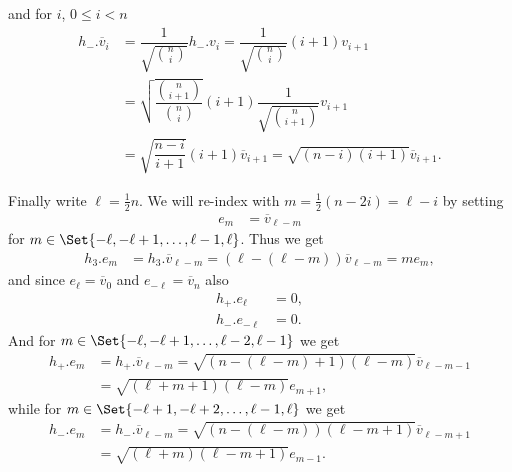 and for $i$, $0\leq i<n$
\begin{align*}
  h_-.\overline v_i &= \dfrac{1}{\sqrt{\binom{n}{i}}}h_-.v_i = \dfrac{1}{\sqrt{\binom{n}{i}}}(i+1)v_{i+1} \\
         &= \sqrt{\dfrac{\binom{n}{i+1}}{\binom{n}{i}}}(i+1)\dfrac{1}{\sqrt{\binom{n}{i+1}}}v_{i+1} \\
  &= \sqrt{\dfrac{n-i}{i+1}}(i+1)\overline v_{i+1} = \sqrt{(n-i)(i+1)}\overline v_{i+1}.
\end{align*}

Finally write $\ell = \tfrac{1}{2}n$. We will re-index with $m=\tfrac{1}{2}(n-2i)=\ell-i$ by setting
\begin{align*}
  e_m &= \overline v_{\ell-m}
\end{align*}
for $m\in\Set{-\ell,-\ell+1,\dotsc,\ell-1,\ell}$. Thus we get
\begin{align*}
  h_3.e_m &= h_3.\overline v_{\ell-m} = (\ell-(\ell-m))\overline v_{\ell-m} = me_m,
\end{align*}
and since $e_{\ell} = \overline v_0$ and $e_{-\ell} = \overline v_n$ also
\begin{align*}
  h_+.e_{\ell} &= 0,\\
  h_-.e_{-\ell} &= 0.
\end{align*}
And for $m\in\Set{-\ell,-\ell+1,\dotsc,\ell-2,\ell-1}$ we get
\begin{align*}
  h_+.e_m &= h_+.\overline v_{\ell-m} = \sqrt{(n-(\ell-m)+1)(\ell-m)}\overline v_{\ell-m-1} \\
  &= \sqrt{(\ell+m+1)(\ell-m)}e_{m+1},
\end{align*}
while for $m\in\Set{-\ell+1,-\ell+2,\dotsc,\ell-1,\ell}$ we get
\begin{align*}
  h_-.e_m &= h_-.\overline v_{\ell-m} = \sqrt{(n-(\ell-m))(\ell-m+1)}\overline v_{\ell-m+1} \\
  &= \sqrt{(\ell+m)(\ell-m+1)}e_{m-1}.
\end{align*}

